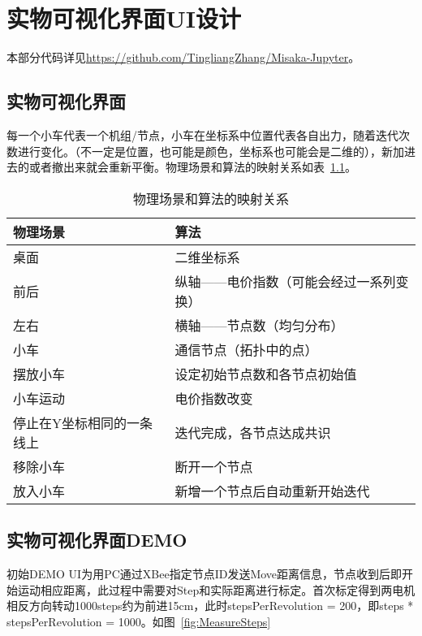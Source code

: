 \chapter{实物可视化界面UI设计}
\label{cha:UI}

本部分代码详见\url{https://github.com/TingliangZhang/Misaka-Jupyter}。

\section{实物可视化界面}

每一个小车代表一个机组/节点，小车在坐标系中位置代表各自出力，随着迭代次数进行变化。（不一定是位置，也可能是颜色，坐标系也可能会是二维的），新加进去的或者撤出来就会重新平衡。物理场景和算法的映射关系如表~\ref{tab:Real-Unreal}。

\begin{table}[htbp]
    \centering
    \begin{tabular}{@{}ll@{}}
    \toprule
    物理场景          & 算法                   \\ \midrule
    桌面            & 二维坐标系                \\
    前后            & 纵轴——电价指数（可能会经过一系列变换） \\
    左右            & 横轴——节点数（均匀分布）        \\
    小车            & 通信节点（拓扑中的点）          \\
    摆放小车          & 设定初始节点数和各节点初始值       \\
    小车运动          & 电价指数改变               \\
    停止在Y坐标相同的一条线上 & 迭代完成，各节点达成共识         \\
    移除小车          & 断开一个节点               \\
    放入小车          & 新增一个节点后自动重新开始迭代      \\ \bottomrule
    \end{tabular}
    \caption{物理场景和算法的映射关系}
    \label{tab:Real-Unreal}
\end{table}

\section{实物可视化界面DEMO}

初始DEMO UI为用PC通过XBee指定节点ID发送Move距离信息，节点收到后即开始运动相应距离，此过程中需要对Step和实际距离进行标定。首次标定得到两电机相反方向转动1000steps约为前进15cm，此时stepsPerRevolution = 200，即steps * stepsPerRevolution = 1000。如图~\ref{fig:MeasureSteps}

